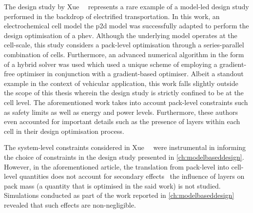 

The  design study  by Xue~\etal~\cite{Xue2014}  represents a  rare example  of a
model-led design study performed in  the backdrop of electrified transportation.
In  this work,  an electrochemical  cell model  \viz{} the  \gls{p2d} model  was
successfully  adapted  to  perform  the design  optimisation  of  a  \gls{phev}.
Although the underlying  model operates at the cell-scale,  this study considers
a  pack-level  optimisation  through  a series-parallel  combination  of  cells.
Furthermore, an advanced numerical algorithm in  the form of a hybrid solver was
used  which used  a  unique scheme  of employing  a  gradient-free optimiser  in
conjunction with  a gradient-based optimiser.  Albeit a standout example  in the
context of vehicular application, this work  falls slightly outside the scope of
this thesis  wherein the  design study is  strictly confined to  be at  the cell
level. The aforementioned work takes into account pack-level constraints such as
safety limits  as well as  energy and  power levels. Furthermore,  these authors
even accounted for important details such  as the presence of layers within each
cell in their design optimisation process.

The  system-level   constraints  considered  in   Xue~\etal~\cite{Xue2014}  were
instrumental  in  informing  the  choice  of constraints  in  the  design  study
presented in \cref{ch:modelbaseddesign}. However, in the aforementioned article,
the translation from pack-level into  cell-level quantities does not account for
secondary effects \ie~the influence of layers on pack mass (a quantity that is
optimised in the said work) is not studied. Simulations conducted as part of the
work  reported  in \cref{ch:modelbaseddesign}  revealed  that  such effects  are
non-negligible.


